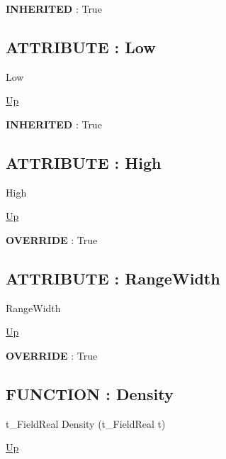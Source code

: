 \par
\par
\textbf{INHERITED} : True \\
\subsection*{ATTRIBUTE : Low}
\hypertarget{ecldoc:linearregression.ols.fdistribution.low}{}
\begin{minipage}[t]{\textwidth}
\begin{flushleft}
 Low 
\end{flushleft}
\end{minipage}
\hyperlink{ecldoc:linearregression.ols.fdistribution}{Up}

\par
\par
\textbf{INHERITED} : True \\
\subsection*{ATTRIBUTE : High}
\hypertarget{ecldoc:linearregression.ols.fdistribution.high}{}
\begin{minipage}[t]{\textwidth}
\begin{flushleft}
 High 
\end{flushleft}
\end{minipage}
\hyperlink{ecldoc:linearregression.ols.fdistribution}{Up}

\par
\par
\textbf{OVERRIDE} : True \\
\subsection*{ATTRIBUTE : RangeWidth}
\hypertarget{ecldoc:linearregression.ols.fdistribution.rangewidth}{}
\begin{minipage}[t]{\textwidth}
\begin{flushleft}
 RangeWidth 
\end{flushleft}
\end{minipage}
\hyperlink{ecldoc:linearregression.ols.fdistribution}{Up}

\par
\par
\textbf{OVERRIDE} : True \\
\subsection*{FUNCTION : Density}
\hypertarget{ecldoc:linearregression.ols.fdistribution.density}{}
\begin{minipage}[t]{\textwidth}
\begin{flushleft}
t\_FieldReal Density (t\_FieldReal t)
\end{flushleft}
\end{minipage}
\hyperlink{ecldoc:linearregression.ols.fdistribution}{Up}


